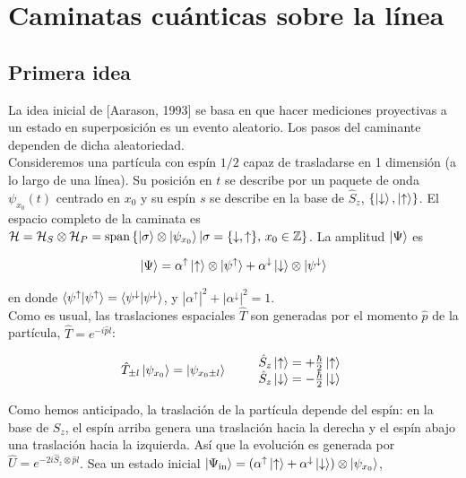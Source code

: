 \chapter{Caminatas cuánticas sobre la línea}

\section{Primera idea}\label{IdeaOriginal}
La idea inicial de [Aarason, 1993] se basa en que hacer mediciones proyectivas a un estado en superposición es un evento aleatorio. Los pasos del caminante dependen de dicha aleatoriedad.\\

Consideremos una partícula con espín $1/2$ capaz de trasladarse en 1 dimensión (a lo largo de una línea). Su posición en $t$ se describe por un paquete de onda $\psi_{x_0}(t)$ centrado en $x_0$ y su espín $s$ se describe en la base de $\hat{S}_z$, $\{\ket{\downarrow},\ket{\uparrow}\}$. 
El espacio completo de la caminata es $\mathcal{H}=\mathcal{H}_S\otimes\mathcal{H}_P=\text{span}\left\{\ket{\sigma}\otimes \ket{\psi_{x_0}}|\sigma=\{\downarrow,\uparrow\},\,x_0\in \mathbb{Z}\right\}$. La amplitud $\ket{\Psi}$ es

\begin{equation}
    \ket{\Psi}=\alpha^{\uparrow}\ket{\uparrow}\otimes\ket{\psi^\uparrow}+\alpha^\downarrow\ket{\downarrow}\otimes\ket{\psi^\downarrow}
\end{equation}{}

en donde $\braket{\psi^\uparrow|\psi^\uparrow}=\braket{\psi^\downarrow|\psi^\downarrow}$, y $|\alpha^\uparrow|^2+|\alpha^\downarrow|^2=1$.\\

Como es usual, las traslaciones espaciales $\hat{T}$ son generadas por el momento $\hat{p}$ de la partícula, $\hat{T}=e^{-i\hat{p}l}$:

\begin{equation}
    \hat{T}_{\pm l}\ket{\psi_{x_0}}=\ket{\psi_{x_0 \pm l}}\qquad
    \begin{array}{cc}
    \hat{S}_z\ket{\uparrow}=+\frac{\hbar}{2}\ket{\uparrow}\\
    \hat{S}_z\ket{\downarrow}=-\frac{\hbar}{2}\ket{\downarrow}
    \end{array}
\end{equation}

Como hemos anticipado, la traslación de la partícula depende del espín: en la base de $S_z$, el espín arriba genera una traslación hacia la derecha y el espín abajo una traslación hacia la izquierda. Así que la evolución es generada por $\hat{U}=e^{-2i\hat{S}_z\otimes \hat{p}l}$. Sea un estado inicial $\ket{\Psi_{\text{in}}}=(\alpha^{\uparrow}\ket{\uparrow}+\alpha^{\downarrow}\ket{\downarrow})\otimes\ket{\psi_{x_0}}$,


